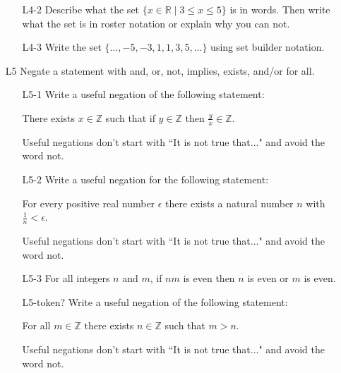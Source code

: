 \documentclass[11pt]{article}
\begin{document}
\begin{itemize}
\begin{enumerate}
	\item[L4-2] Describe what the set $\{x\in\mathbb{R} \mid 3\leq x\leq 5\}$ is in words. Then write what the set is in roster notation or explain why you can not.

		\item[L4-3] Write the set $\{\dots, -5,-3,1,1,3,5,\dots\}$ using set builder notation.
	\end{enumerate}

\newpage	

\item[L5]  Negate a statement with and, or, not, implies, exists, and/or for all.
	\begin{enumerate}
		\item[L5-1] Write a useful negation of the following statement:
		\begin{center}
		There exists $x\in\mathbb{Z}$ such that if $y\in \mathbb{Z}$ then $\frac{y}{x}\in\mathbb{Z}$.
		\end{center}
		Useful negations don't start with ``It is not true that..." and avoid the word not.
		
		\item[L5-2] Write a useful negation for the following statement:
		\begin{center}
		For every positive real number $\epsilon$ there exists a natural number $n$ with $\frac{1}{n}<\epsilon$.
		\end{center}
		Useful negations don't start with ``It is not true that..." and avoid the word not.
		
	
	\item[L5-3] For all integers $n$ and $m$, if $nm$ is even then $n$ is even or $m$ is even.
		
	\item[L5-token?]  Write a useful negation of the following statement:
		\begin{center}
		For all $m\in\mathbb{Z}$ there exists $n\in\mathbb{Z}$ such that $m>n$.
		\end{center}
		Useful negations don't start with ``It is not true that..." and avoid the word not.
	\end{enumerate}
\end{itemize}


\newpage
\end{document}
